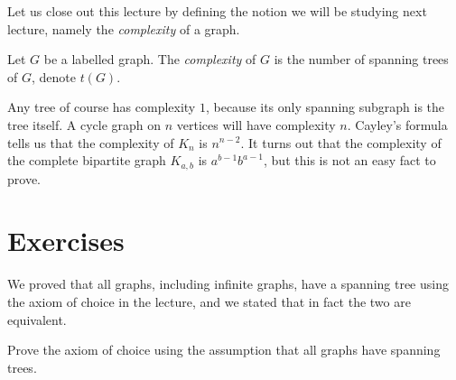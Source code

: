 \documentclass[nobib]{tufte-handout}
\begin{document}
Let us close out this lecture by defining the notion we will be studying next lecture, namely the \emph{complexity} of a graph.

\begin{definition}
  Let $G$ be a labelled graph. The \emph{complexity} of $G$ is the number of spanning trees of $G$, denote $t(G)$.
\end{definition}

\begin{example}
  Any tree of course has complexity $1$, because its only spanning subgraph is the tree itself. A cycle graph on $n$ vertices will have complexity $n$. Cayley's formula tells us that the complexity of $K_n$ is $n^{n-2}$. It turns out that the complexity of the complete bipartite graph $K_{a,b}$ is $a^{b-1}b^{a-1}$, but this is not an easy fact to prove.
\end{example}

\section{Exercises}

\begin{xca}
  We proved that all graphs, including infinite graphs, have a spanning tree using the axiom of choice in the lecture, and we stated that in fact the two are equivalent.

  Prove the axiom of choice using the assumption that all graphs have spanning trees.
\end{xca}
%
%
\end{document}
